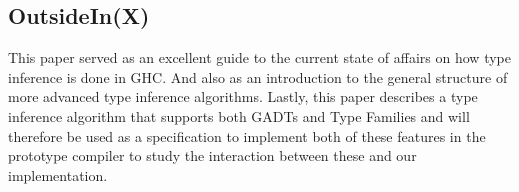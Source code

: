 \subsection{OutsideIn(X)\cite{outsideinx-modular-type-inference-with-local-assumptions}}
This paper served as an excellent guide to the current state of affairs on how
type inference is done in GHC. And also as an introduction to the general
structure of more advanced type inference algorithms. Lastly, this paper
describes a type inference algorithm that supports both GADTs and Type Families
and will therefore be used as a specification to implement both of these
features in the prototype compiler to study the interaction between these and
our implementation.

